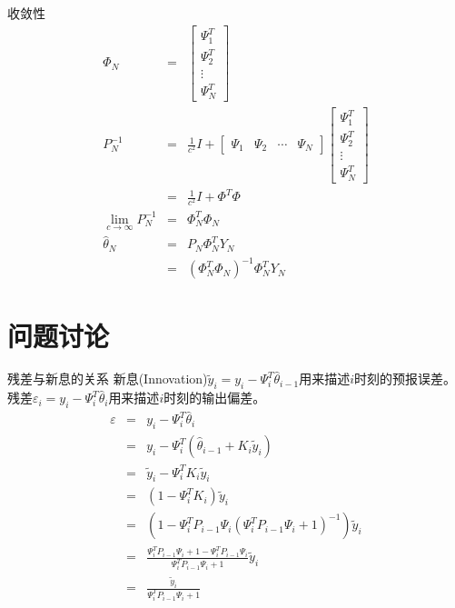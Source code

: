 \begin{frame}{收敛性}
\begin{eqnarray*}
\Phi_N &=& \begin{bmatrix} \Psi_{1}^T \\ \Psi_{2}^T \\ \vdots \\ \Psi_{N}^T \end{bmatrix}  \\
P_N^{-1} &=& \frac{1}{c^2}I+
\begin{bmatrix} \Psi_{1} & \Psi_{2} & \cdots & \Psi_{N} \end{bmatrix}
\begin{bmatrix} \Psi_{1}^T \\ \Psi_{2}^T \\ \vdots \\ \Psi_{N}^T \end{bmatrix}  \\
&=& \frac{1}{c^2}I+\Phi^T\Phi \\
\lim_{c\to\infty}P_N^{-1} &=& \Phi_N^T\Phi_N  \\
\hat\theta_N &=& P_N\Phi_N^T Y_N \\
 &=& (\Phi_N^T\Phi_N)^{-1}\Phi_N^T Y_N 
\end{eqnarray*}
\end{frame}

\section{问题讨论}
\begin{frame}{残差与新息的关系}
新息(Innovation)$\tilde y_i = y_i - \Psi_i^T \hat\theta_{i-1}$用来描述$i$时刻的预报误差。
残差$\varepsilon_i = y_i - \Psi_i^T\hat\theta_i$用来描述$i$时刻的输出偏差。
\begin{eqnarray*}
\varepsilon &=& y_i - \Psi_i^T\hat\theta_i  \\
&=& y_i - \Psi_i^T(\hat\theta_{i-1}+K_i \tilde y_i) \\
&=& \tilde y_i -\Psi_i^T K_i \tilde y_i \\
&=& (1-\Psi_i^T K_i) \tilde y_i \\
&=& (1-\Psi_i^T P_{i-1} \Psi_i(\Psi_i^T P_{i-1} \Psi_i+1)^{-1}) \tilde y_i \\
&=& \frac{\Psi_i^T P_{i-1} \Psi_i+1-\Psi_i^T P_{i-1} \Psi_i}{\Psi_i^T P_{i-1} \Psi_i+1} \tilde y_i \\
&=& \frac{\tilde y_i}{\Psi_i^T P_{i-1} \Psi_i+1}  
\end{eqnarray*}
\end{frame}

